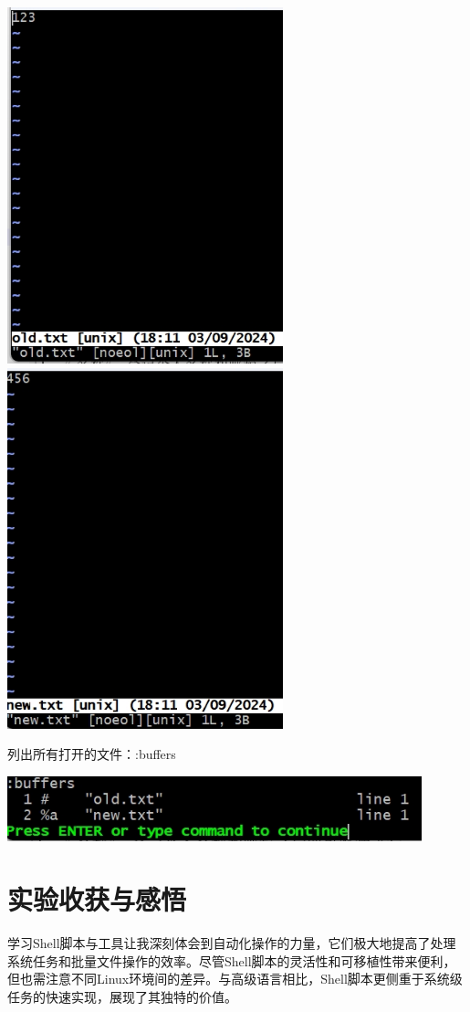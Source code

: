 \documentclass[UTF8,a4paper]{ctexart}
\begin{document}
\begin{sloppypar}
	\includegraphics[width = 8cm]{61}
	\includegraphics[width = 8cm]{62}

	列出所有打开的文件：:buffers
	
	\includegraphics[width = 12cm]{63}
	
	\section{实验收获与感悟}
	学习Shell脚本与工具让我深刻体会到自动化操作的力量，它们极大地提高了处理系统任务和批量文件操作的效率。尽管Shell脚本的灵活性和可移植性带来便利，但也需注意不同Linux环境间的差异。与高级语言相比，Shell脚本更侧重于系统级任务的快速实现，展现了其独特的价值。
	

\end{sloppypar}
\end{document}
